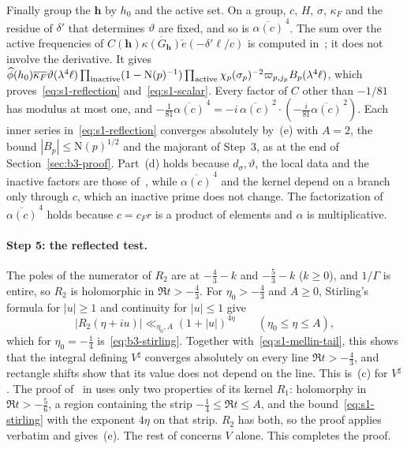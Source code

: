 \documentclass[11pt]{article}
\numberwithin{equation}{section}
\newcommand{\N}{\mathrm N}
\newcommand{\ce}{\check e}
\begin{document}
Finally group the $\mathbf h$ by $h_0$ and the active set. On a group, $c$, $H$, $\sigma$, $\kappa_F$ and the residue
of $\delta'$ that determines $\vartheta$ are fixed, and so is $\overline{\alpha(c)}^{\,4}$. The sum over the active
frequencies of $C(\mathbf h)\overline{\kappa(G_{\mathbf h})}\ce(-\delta'\ell/c)$ is computed
in~\cite[proof of Proposition~5.1, \emph{The reflected additive phase}]{OAI78}; it does not involve the derivative. It gives
$\widehat\phi(h_0)\overline{\kappa_F}\vartheta(\lambda^4\ell)\prod_{\rm inactive}(1-\N(p)^{-1})\prod_{\rm active}
\chi_p(\sigma_p)^{-2}\varpi_{p,j_p}B_p(\lambda^4\ell)$, which proves~\eqref{eq:s1-reflection}
and~\eqref{eq:s1-scalar}. Every factor of $C$ other than $-1/81$ has modulus at most one, and
$-\frac1{81}\overline{\alpha(c)}^{\,4}=-i\,\overline{\alpha(c)}^{\,2}\cdot(-\frac i{81}\overline{\alpha(c)}^{\,2})$.
Each inner series in~\eqref{eq:s1-reflection} converges absolutely by~(e) with $A=2$, the bound $|B_p|\le\N(p)^{1/2}$
and the majorant of Step~3, as at the end of Section~\ref{sec:b3-proof}. Part~(d) holds because $d_\sigma,\vartheta$, the
local data and the inactive factors are those of~\cite{OAI78}, while $\overline{\alpha(c)}^{\,4}$ and the kernel
depend on a branch only through $c$, which an inactive prime does not change. The factorization of
$\overline{\alpha(c)}^{\,4}$ holds because $c=c_Fr$ is a product of elements and $\alpha$ is multiplicative.

\paragraph{Step 5: the reflected test.} The poles of the numerator of $R_2$ are at $-\frac43-k$ and $-\frac53-k$
($k\ge0$), and $1/\Gamma$ is entire, so $R_2$ is holomorphic in $\Re t>-\frac43$. For $\eta_0>-\frac43$ and $A\ge0$,
Stirling's formula for $|u|\ge1$ and continuity for $|u|\le1$ give
\begin{equation}\label{eq:s1-stirling}
 |R_2(\eta+iu)|\ll_{\eta_0,A}(1+|u|)^{4\eta}\qquad(\eta_0\le\eta\le A),
\end{equation}
which for $\eta_0=-\frac14$ is~\eqref{eq:b3-stirling}. Together with~\eqref{eq:s1-mellin-tail}, this shows that the
integral defining $V^\sharp$ converges absolutely on every line $\Re t>-\frac43$, and rectangle shifts show that its
value does not depend on the line. This is~(c) for $V^\sharp$. The proof of~\cite[eqs.~(5.4) and~(5.5)]{OAI78} in \cite[proof of Proposition~5.1, \emph{Uniform estimates for the transformed test}]{OAI78} uses only two properties of its kernel $R_1$: holomorphy in
$\Re t>-\frac56$, a region containing the strip $-\frac14\le\Re t\le A$, and the bound~\eqref{eq:s1-stirling} with
the exponent $4\eta$ on that strip. $R_2$ has both, so the proof applies verbatim and gives~(e). The rest of \cite[proof of Proposition~5.1, \emph{Uniform estimates for the transformed test}]{OAI78}
concerns $V$ alone. This completes the proof.
\end{document}

